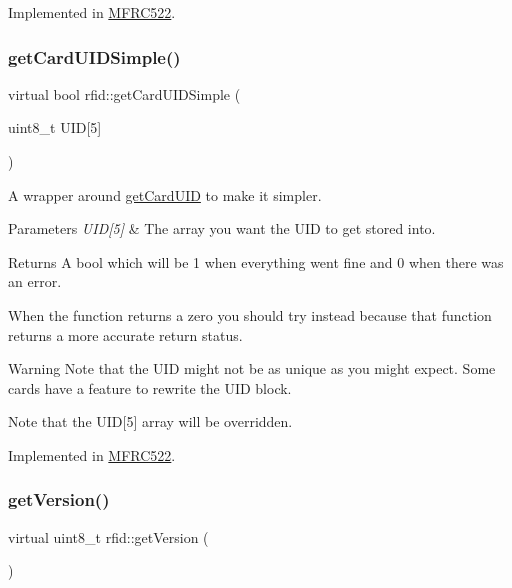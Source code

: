 Implemented in \mbox{\hyperlink{class_m_f_r_c522_ad3c7ab4c70988e80c400f36f724a12b7}{M\+F\+R\+C522}}.

\mbox{\label{classrfid_aaeb826495120d8d29683f0ea1b985d77}} 
\subsubsection{\texorpdfstring{get\+Card\+U\+I\+D\+Simple()}{getCardUIDSimple()}}
{\footnotesize\ttfamily virtual bool rfid\+::get\+Card\+U\+I\+D\+Simple (\begin{DoxyParamCaption}\item[{uint8\+\_\+t}]{U\+ID\mbox{[}5\mbox{]} }\end{DoxyParamCaption})\hspace{0.3cm}{\ttfamily [pure virtual]}}



A wrapper around \mbox{\hyperlink{classrfid_afeb2a321694ceaf84db793f5efb3a750}{get\+Card\+U\+ID}} to make it simpler. 


\begin{DoxyParams}{Parameters}
{\em U\+I\+D\mbox{[}5\mbox{]}} & The array you want the U\+ID to get stored into. \\
\hline
\end{DoxyParams}
\begin{DoxyReturn}{Returns}
A bool which will be 1 when everything went fine and 0 when there was an error.
\end{DoxyReturn}
When the function returns a zero you should try  instead because that function returns a more accurate return status. \begin{DoxyWarning}{Warning}
Note that the U\+ID might not be as unique as you might expect. Some cards have a feature to rewrite the U\+ID block. 

Note that the U\+ID\mbox{[}5\mbox{]} array will be overridden. 
\end{DoxyWarning}


Implemented in \mbox{\hyperlink{class_m_f_r_c522_a33c20be6030f635d986984db4999a1eb}{M\+F\+R\+C522}}.

\mbox{\label{classrfid_a27619628e718bb781f912aead770079a}} 
\subsubsection{\texorpdfstring{get\+Version()}{getVersion()}}
{\footnotesize\ttfamily virtual uint8\+\_\+t rfid\+::get\+Version (\begin{DoxyParamCaption}{ }\end{DoxyParamCaption})\hspace{0.3cm}{\ttfamily [pure virtual]}}



